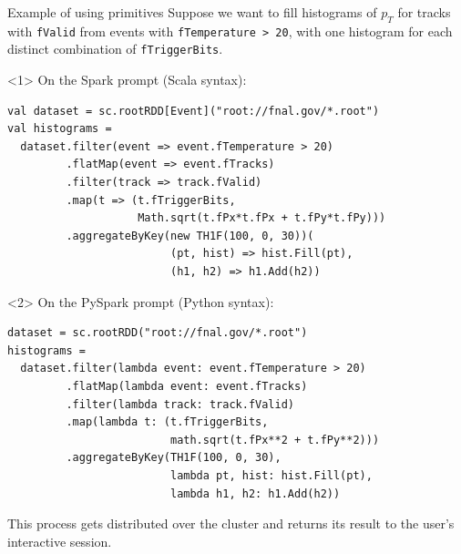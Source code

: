 \documentclass{beamer}
\begin{document}
\begin{frame}[fragile]{Example of using primitives}
Suppose we want to fill histograms of $p_T$ for tracks with {\tt fValid} from events with {\tt fTemperature > 20}, with one histogram for each distinct combination of {\tt fTriggerBits}.

\begin{onlyenv}<1>
\vspace{0.2 cm}
On the Spark prompt (Scala syntax):
\begin{verbatim}
val dataset = sc.rootRDD[Event]("root://fnal.gov/*.root")
val histograms =
  dataset.filter(event => event.fTemperature > 20)
         .flatMap(event => event.fTracks)
         .filter(track => track.fValid)
         .map(t => (t.fTriggerBits,
                    Math.sqrt(t.fPx*t.fPx + t.fPy*t.fPy)))
         .aggregateByKey(new TH1F(100, 0, 30))(
                         (pt, hist) => hist.Fill(pt),
                         (h1, h2) => h1.Add(h2))
\end{verbatim}
\end{onlyenv}
\begin{onlyenv}<2>
\vspace{0.2 cm}
On the PySpark prompt (Python syntax):
\begin{verbatim}
dataset = sc.rootRDD("root://fnal.gov/*.root")
histograms =
  dataset.filter(lambda event: event.fTemperature > 20)
         .flatMap(lambda event: event.fTracks)
         .filter(lambda track: track.fValid)
         .map(lambda t: (t.fTriggerBits,
                         math.sqrt(t.fPx**2 + t.fPy**2)))
         .aggregateByKey(TH1F(100, 0, 30),
                         lambda pt, hist: hist.Fill(pt),
                         lambda h1, h2: h1.Add(h2))
\end{verbatim}
\end{onlyenv}

This process gets distributed over the cluster and returns its result to the user's  interactive session.
\end{frame}
\end{document}
